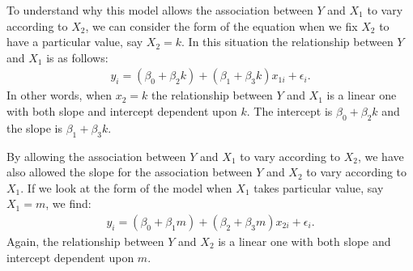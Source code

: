 \documentclass[letterpaper,10pt,english]{jupyterBook}
\begin{document}
\sphinxAtStartPar
To understand why this model allows the association between \(Y\) and \(X_1\) to vary according to \(X_2\), we can consider the form of the equation when we fix \(X_2\) to have a particular value, say \(X_2=k\). In this situation the relationship between \(Y\) and \(X_1\) is as follows:
\begin{equation*}
\begin{split}
y_i = (\beta_0 + \beta_2k) + (\beta_1 + \beta_3k)x_{1i} + \epsilon_i.
\end{split}
\end{equation*}
\sphinxAtStartPar
In other words, when \(x_2=k\) the relationship between \(Y\) and \(X_1\) is a linear one with both slope and intercept dependent upon \(k\). The intercept is \(\beta_0+\beta_2k\) and the slope is \(\beta_1 +  \beta_3k\).

\sphinxAtStartPar
By allowing the association between \(Y\) and \(X_1\) to vary according to \(X_2\), we have also allowed the slope for the association between \(Y\) and \(X_2\) to vary according to \(X_1\). If we look at the form of the model when \(X_1\) takes particular value, say \(X_1=m\), we find:
\begin{equation*}
\begin{split}
y_i = (\beta_0+\beta_1m) + (\beta_2+\beta_3m)x_{2i} + \epsilon_i.
\end{split}
\end{equation*}
\sphinxAtStartPar
Again, the relationship between \(Y\) and \(X_2\) is a linear one with both slope and intercept dependent upon \(m\).
\end{document}
